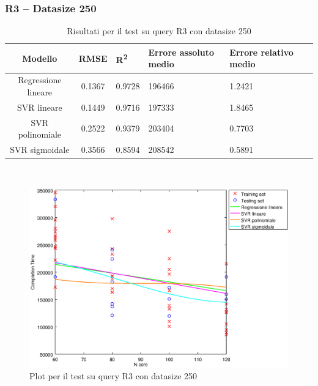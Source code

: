 \documentclass[a4paper,11pt]{article}
\begin{document}
\subsubsection{R3 -- Datasize 250}
\begin{table}[bhpt]
	\centering
	\begin{adjustbox}{center}
		\begin{tabular}{c | c M{1.2cm} M{2.5cm} M{2.5cm} M{1.8cm}}
			Modello & RMSE & R\textsuperscript{2} & Errore assoluto medio & Errore relativo medio \tabularnewline
			\hline
			Regressione lineare & 0.1367 & 0.9728 & 196466 & 1.2421 \\
			SVR lineare & 0.1449 & 0.9716 & 197333 & 1.8465 \\
			SVR polinomiale & 0.2522 & 0.9379 & 203404 & 0.7703 \\
			SVR sigmoidale & 0.3566 & 0.8594 & 208542 & 0.5891 \\
		\end{tabular}
	\end{adjustbox}
	\\
	\caption{Risultati per il test su query R3 con datasize 250}
	\label{table_R3_250}
\end{table}

\begin {figure}[hbtp]
\centering
\includegraphics[width=\textwidth]{output/R3_250/plot_R3_250.eps}
\caption {Plot per il test su query R3 con datasize 250}
\end {figure}
\newpage
\end{document}
